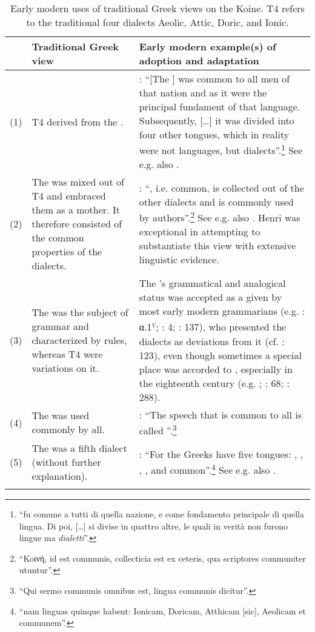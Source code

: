\begin{sidewaystable}\footnotesize
\caption{Early modern uses of traditional Greek views on the Koine. T4 refers to the traditional four dialects Aeolic, Attic, Doric, and Ionic.\label{tab:2.2}}
\begin{tabularx}{\textwidth}{l@{ }QQ}
\lsptoprule 
 & {Traditional Greek view} & Early modern example(s) of adoption and adaptation\\\midrule
 (1) & T4 derived from the . & \citet[335]{Borghini1971}: “[The ] was common to all men of that nation and as it were the principal fundament of that language. Subsequently, […] it was divided into four other tongues, which in reality were not languages, but dialects”.\footnote{“fu comune a tutti di quella nazione, e come fondamento principale di quella lingua. Di poi, […] si divise in quattro altre, le quali in verità non furono lingue ma \textit{dialetti}”.} See e.g. also \citet[209]{Vergara1537}.\\
 (2) & The  was mixed out of T4 and embraced them as a mother. It therefore consisted of the common properties of the dialects. & \citet[52]{Oecolampadius1518}: “, i.e. common, is collected out of the other dialects and is commonly used by authors”.\footnote{“Koινή, id est communis, collecticia est ex ceteris, qua scriptores communiter utuntur”.} See e.g. also \citet[10\textsc{\textsuperscript{r}}\textsc{–10}\textsc{\textsuperscript{v}}]{Girard1541}. Henri \citet[28--34]{Estienne1581} was exceptional in attempting to substantiate this view with extensive linguistic evidence.\\
 (3) & The  was the subject of grammar and characterized by rules, whereas T4 were variations on it. & The ’s grammatical and analogical status was accepted as a given by most early modern grammarians (e.g. \citealt{Gaza1495}: α.1\textsc{\textsuperscript{v}}; \citealt{Schmidt1604}: 4; \citealt{Walch1772}: 137), who presented the dialects as deviations from it (cf. \citealt{Ciccolella2008}: 123), even though sometimes a special place was accorded to , especially in the eighteenth century (e.g. \citealt{Luscinius1517}; \citealt{Hemsterhuis1721}: 68; \citealt{Jehne1782}: 288).\\
 (4) & The  was used commonly by all. & \citet[a.i\textsc{\textsuperscript{v}}]{Melanchthon1518}: “The speech that is common to all is called ”.\footnote{“Qui sermo communis omnibus est, lingua communis dicitur”.}\\
 (5) & The  was a fifth dialect (without further explanation). & \citet[138\textsc{\textsuperscript{v}}]{Beroaldo1493}: “For the Greeks have five tongues: , , , , and common”.\footnote{“nam linguas quinque habent: Ionicam, Doricam, Atthicam [sic], Aeolicam et communem”.} See e.g. also \citet[85\textsc{\textsuperscript{r}}]{Perotti1489}.\\
\lspbottomrule
\end{tabularx}
\end{sidewaystable}

